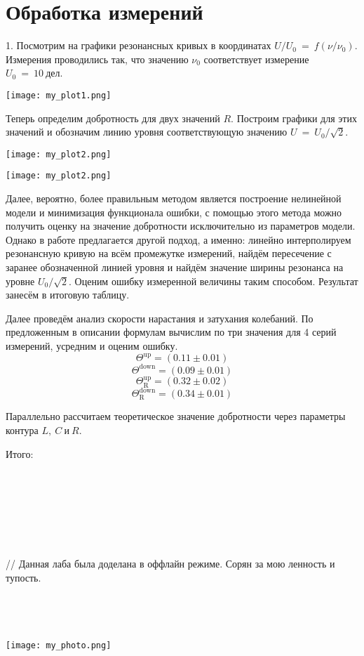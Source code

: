 \section{\label{sec:level1}Обработка измерений}

1. Посмотрим на графики резонансных кривых в координатах $U/U_0~=~f(\nu/\nu_0)$. Измерения проводились так, что значению $\nu_0$ соответствует измерение $U_0~=~10~\text{дел}$. 

\texttt{[image: my\_plot1.png]}

Теперь определим добротность для двух значений $R$. Построим графики для этих значений и обозначим линию уровня соответствующую значению $U~=~U_0/\sqrt{2}$. 

\texttt{[image: my\_plot2.png]}

\texttt{[image: my\_plot2.png]}

Далее, вероятно, более правильным методом является построение нелинейной модели и минимизация функционала ошибки, с помощью этого метода можно получить оценку на значение добротности исключительно из параметров модели. Однако в работе предлагается другой подход, а именно: линейно интерполируем резонансную кривую на всём промежутке измерений, найдём пересечение с заранее обозначенной линией уровня и найдём значение ширины резонанса на уровне $U_0/\sqrt{2}$. Оценим ошибку измеренной величины таким способом. Результат занесём в итоговую таблицу.

Далее проведём анализ скорости нарастания и затухания колебаний. По предложенным в описании формулам вычислим по три значения для 4 серий измерений, усредним и оценим ошибку. 
$$ \Theta^{\text{up}} = (0.11 \pm 0.01) $$
$$ \Theta^{\text{down}} = (0.09 \pm 0.01) $$
$$ \Theta^{\text{up}}_{\text{R}} = (0.32 \pm 0.02) $$
$$ \Theta^{\text{down}}_{\text{R}} = (0.34 \pm 0.01) $$

\newpage
Параллельно рассчитаем теоретическое значение добротности через параметры контура $L,~C~\text{и}~R$.

Итого:
\\
\\
\\
\\
\\
\\
\\
\\
// Данная лаба была доделана в оффлайн режиме. Сорян за мою ленность и тупость.
\\
\\
\\
\\
\\

\newpage
\texttt{[image: my\_photo.png]}





